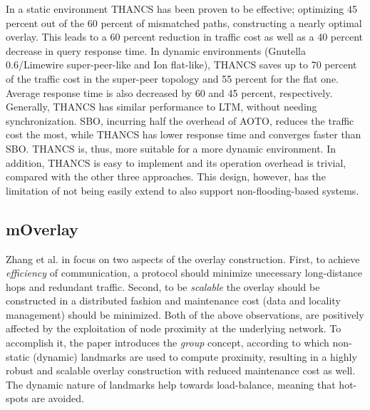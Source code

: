 \documentclass[a4paper,10pt]{article}
\begin{document}
In a static environment THANCS has been proven to be effective; optimizing 45 percent out of the 60 percent of mismatched paths, constructing a nearly optimal overlay. This leads to a 60 percent reduction in traffic cost as well as a 40 percent decrease in query response time. In dynamic environments (Gnutella 0.6/Limewire super-peer-like and Ion flat-like), THANCS saves up to 70 percent of the traffic cost in the super-peer topology and 55 percent for the flat one. Average response time is also decreased by 60 and 45 percent, respectively. Generally, THANCS has similar performance to LTM, without needing synchronization. SBO, incurring half the  overhead of AOTO, reduces the traffic cost the most, while THANCS has lower response time and converges faster than SBO. THANCS is, thus, more suitable for a more dynamic environment. In addition, THANCS is easy to implement and its operation overhead is trivial, compared with the other three approaches. This design, however, has the limitation of not being easily extend to also support non-flooding-based systems.

\subsection{mOverlay}
Zhang et al. in \cite{zhang_moverlay_2004} focus on two aspects of the overlay construction. First, to achieve \emph{efficiency} of communication, a protocol should minimize unecessary long-distance hops and redundant traffic. Second, to be \emph{scalable} the overlay should be constructed in a distributed fashion and maintenance cost (data and locality management) should be minimized. Both of the above observations, are positively affected by the exploitation of node proximity at the underlying network. To accomplish it, the paper introduces the \emph{group} concept, according to which non-static (dynamic) landmarks are used to compute proximity, resulting in a highly robust and scalable overlay construction with reduced maintenance cost as well. The dynamic nature of landmarks help towards load-balance, meaning that hot-spots are avoided.
\end{document}
